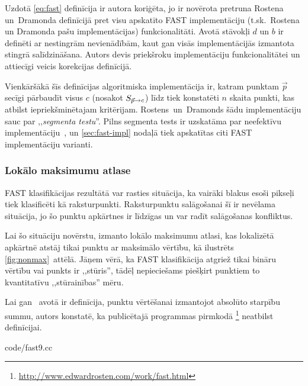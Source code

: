 Uzdotā \eqref{eq:fast} definīcija ir autora koriģēta, jo ir novērota pretruna
Rostena un~Dramonda\cite{FAST} definīcijā pret visu apskatīto
FAST implementāciju (t.sk.~Rostena un Dramonda\cite{FAST} pašu implementācijas)
funkcionalitāti. Avotā \cite{FAST} stāvokļi $d$ un $b$ ir definēti ar
nestingrām nevienādībām, kaut gan visās implementācijās izmantota stingrā
salīdzināšana. Autors devis priekšroku implementāciju funkcionalitātei un
attiecīgi veicis korekcijas definīcijā.

Vienkāršākā šīs definīcijas algoritmiska implementācija ir, katram
punktam $\vec{p}$ secīgi pārbaudīt visus $c$ (nosakot ${S_{\vec{p} \to c}}$)
līdz tiek konstatēti $n$ skaita punkti, kas atbilst iepriekšminētajam
kritērijam. Rostens~un~Dramonds\cite{FAST} šādu implementāciju sauc par
,,\emph{segmenta testu}''. Pilns segmenta tests ir uzskatāma par 
neefektīvu implementāciju~\cite{FAST},
un \ref{sec:fast-impl} nodaļā tiek apskatītas citi FAST implementāciju varianti.


\subsubsection{Lokālo maksimumu atlase}
FAST klasifikācijas rezultātā var rasties situācija, ka vairāki 
blakus esoši pikseļi tiek klasificēti kā raksturpunkti.
Raksturpunktu salāgošanai šī ir nevēlama situācija, jo šo punktu apkārtnes
ir līdzīgas un var radīt salāgošanas konfliktus.

Lai šo situāciju novērstu, izmanto lokālo maksimumu atlasi, kas lokalizētā
apkārtnē atstāj tikai punktu ar maksimālo vērtību, kā ilustrēts \ref{fig:nonmax}~attēlā.
Jāņem vērā, ka FAST
klasifikācija atgriež tikai bināru vērtību vai punkts ir ,,stūris'',
tādēļ nepieciešams piešķirt punktiem to kvantitatīvu ,,stūrainības'' mēru.

Lai gan \cite{FAST}~avotā ir definīcija, punktu vērtēšanai izmantojot
absolūto starpību summu, autors konstatē, ka publicētajā programmas pirmkodā%
\footnote{\url{http://www.edwardrosten.com/work/fast.html}}
neatbilst definīcijai.

	
		{code/fast9.cc}

